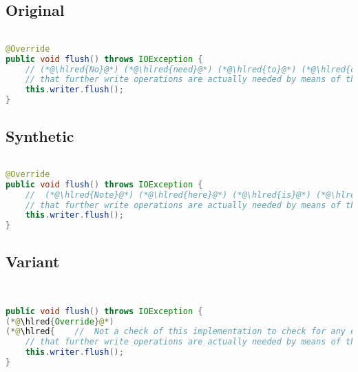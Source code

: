 \documentclass[11pt]{article}
\DeclareRobustCommand{\hlred}[1]{{\sethlcolor{YellowOrange}\hl{#1}}}
\begin{document}
  \subsection{Original}
  \begin{lstlisting}[language=java]

@Override
public void flush() throws IOException {
    // (*@\hlred{No}@*) (*@\hlred{need}@*) (*@\hlred{to}@*) (*@\hlred{control}@*) (*@\hlred{overflow}@*) (*@\hlred{here.}@*) (*@\hlred{The}@*) (*@\hlred{fact}@*) (*@\hlred{that}@*) (*@\hlred{this}@*) (*@\hlred{has}@*) (*@\hlred{overflow}@*) (*@\hlred{will}@*) (*@\hlred{be}@*) (*@\hlred{used}@*) (*@\hlred{as}@*) (*@\hlred{a}@*) (*@\hlred{flag}@*) to(*@\hlred{ determine}@*)
    // that further write operations are actually needed by means of the isOverflown() method.
    this.writer.flush();
}
  \end{lstlisting}
  \subsection{Synthetic}

  \begin{lstlisting}[language=java]

@Override
public void flush() throws IOException {
    //  (*@\hlred{Note}@*) (*@\hlred{here}@*) (*@\hlred{is}@*) (*@\hlred{an}@*) (*@\hlred{exception}@*) (*@\hlred{that}@*) (*@\hlred{may}@*) (*@\hlred{result}@*) (*@\hlred{when}@*) (*@\hlred{the}@*) (*@\hlred{writer}@*) (*@\hlred{checks}@*) (*@\hlred{whether}@*) (*@\hlred{there}@*) (*@\hlred{exist}@*) (*@\hlred{problems}@*) (*@\hlred{or}@*) (*@\hlred{otherwise}@*) to
    // that further write operations are actually needed by means of the isOverflown() method.
    this.writer.flush();
}
  \end{lstlisting}

  \subsection{Variant}

  \begin{lstlisting}[language=java]


public void flush() throws IOException {
(*@\hlred{Override}@*)
(*@\hlred{    //  Not a check of this implementation to check for any errors but also it seems useful here as to}@*)
    // that further write operations are actually needed by means of the isOverflown() method.
    this.writer.flush();
}
  \end{lstlisting}
\end{document}
